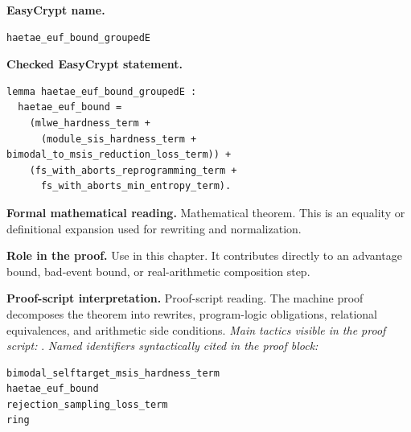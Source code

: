\begin{formaltheorem}
\noindent\textbf{EasyCrypt name.}
\begin{lstlisting}[language=EasyCrypt,basicstyle=\ttfamily\scriptsize]
haetae_euf_bound_groupedE
\end{lstlisting}
\noindent\textbf{Checked EasyCrypt statement.}
\begin{lstlisting}[language=EasyCrypt,basicstyle=\ttfamily\scriptsize]
lemma haetae_euf_bound_groupedE :
  haetae_euf_bound =
    (mlwe_hardness_term +
      (module_sis_hardness_term + bimodal_to_msis_reduction_loss_term)) +
    (fs_with_aborts_reprogramming_term +
      fs_with_aborts_min_entropy_term).
\end{lstlisting}
\noindent\textbf{Formal mathematical reading.}
Mathematical theorem. This is an equality or definitional expansion used for rewriting and normalization.

\noindent\textbf{Role in the proof.}
Use in this chapter. It contributes directly to an advantage bound, bad-event bound, or real-arithmetic composition step.

\noindent\textbf{Proof-script interpretation.}
Proof-script reading. The machine proof decomposes the theorem into rewrites, program-logic obligations, relational equivalences, and arithmetic side conditions.
\emph{Main tactics visible in the proof script:} .
\emph{Named identifiers syntactically cited in the proof block:}
\begin{lstlisting}[language=EasyCrypt,basicstyle=\ttfamily\scriptsize]
bimodal_selftarget_msis_hardness_term
haetae_euf_bound
rejection_sampling_loss_term
ring
\end{lstlisting}

\end{formaltheorem}

